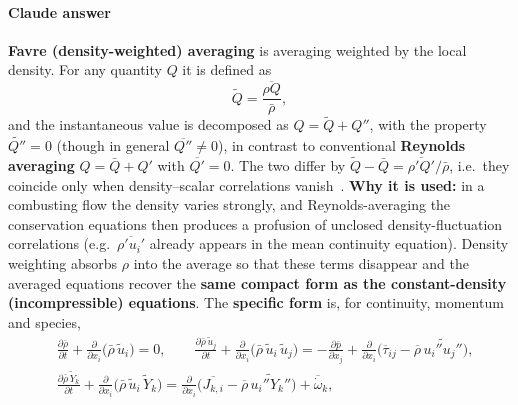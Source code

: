 {\color{istblue}
\paragraph{Claude answer}
\textbf{Favre (density-weighted) averaging} is averaging weighted by the local density. For any quantity $Q$ it is defined as
\begin{equation*}
\tilde Q = \frac{\overline{\rho Q}}{\bar\rho},
\end{equation*}
and the instantaneous value is decomposed as $Q = \tilde Q + Q''$, with the property $\widetilde{Q''}=0$ (though in general $\overline{Q''}\neq 0$), in contrast to conventional \textbf{Reynolds averaging} $Q=\bar Q + Q'$ with $\overline{Q'}=0$. The two differ by $\tilde Q - \bar Q = \overline{\rho' Q'}/\bar\rho$, i.e.\ they coincide only when density--scalar correlations vanish~\cite{warnatz2006combustion,veynante2002turbulent}. \textbf{Why it is used:} in a combusting flow the density varies strongly, and Reynolds-averaging the conservation equations then produces a profusion of unclosed density-fluctuation correlations (e.g.\ $\overline{\rho' u_i'}$ already appears in the mean continuity equation). Density weighting absorbs $\rho$ into the average so that these terms disappear and the averaged equations recover the \textbf{same compact form as the constant-density (incompressible) equations}. The \textbf{specific form} is, for continuity, momentum and species,
\begin{align*}
&\frac{\partial \bar\rho}{\partial t} + \frac{\partial }{\partial x_i}\big(\bar\rho\,\tilde u_i\big) = 0, \qquad
\frac{\partial \bar\rho\,\tilde u_j}{\partial t} + \frac{\partial}{\partial x_i}\big(\bar\rho\,\tilde u_i\,\tilde u_j\big) = -\frac{\partial \bar p}{\partial x_j} + \frac{\partial}{\partial x_i}\Big(\overline{\tau}_{ij} - \overline{\rho}\,\widetilde{u_i'' u_j''}\Big),\\
&\frac{\partial \bar\rho\,\tilde Y_k}{\partial t} + \frac{\partial}{\partial x_i}\big(\bar\rho\,\tilde u_i\,\tilde Y_k\big) = \frac{\partial}{\partial x_i}\Big(\overline{J_{k,i}} - \overline{\rho}\,\widetilde{u_i'' Y_k''}\Big) + \overline{\dot\omega}_k,
\end{align*}
}
